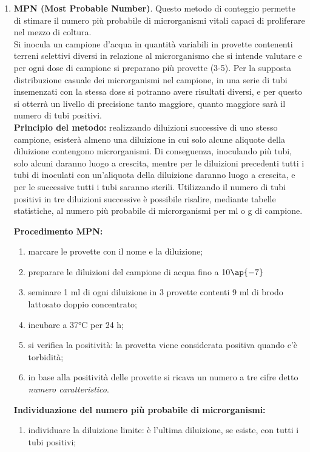 \documentclass[11pt]{book}
\begin{document}
\begin{itemize}
\begin{enumerate}
\item \textbf{MPN (Most Probable Number)}. Questo metodo di conteggio permette di stimare il numero più probabile di microrganismi vitali capaci di proliferare nel mezzo di coltura.\\
Si inocula un campione d’acqua in quantità variabili in provette contenenti terreni selettivi diversi in relazione al microrganismo che si intende valutare e per ogni dose di campione si preparano più provette (3-5).
Per la supposta distribuzione casuale dei microrganismi nel campione, in una serie di tubi insemenzati con la stessa dose si potranno avere risultati diversi, e per questo si otterrà un livello di precisione tanto maggiore, quanto maggiore sarà il numero di tubi positivi.\\
\textbf{Principio del metodo:} realizzando diluizioni successive di uno stesso campione, esisterà almeno una diluizione in cui solo alcune aliquote della diluizione contengono microrganismi. Di conseguenza, inoculando più tubi, solo alcuni daranno luogo a crescita, mentre per le diluizioni precedenti tutti i tubi di inoculati con un’aliquota della diluizione daranno luogo a crescita, e per le successive tutti i tubi saranno sterili. Utilizzando il numero di tubi positivi in tre diluizioni successive è possibile risalire, mediante tabelle statistiche, al numero più probabile di microrganismi per ml o g di campione.

\textbf{Procedimento MPN:}
\begin{enumerate}
\item marcare le provette con il nome e la diluizione;
\item preparare le diluizioni del campione di acqua fino a 10$\ap{-7}$
\item seminare 1 ml di ogni diluizione in 3 provette contenti 9 ml di brodo lattosato doppio concentrato;
\item incubare a 37°C per 24 h;
\item si verifica la positività: la provetta viene considerata positiva quando c’è torbidità;
\item in base alla positività delle provette si ricava un numero a tre cifre detto \emph{numero caratteristico}.\\
\end{enumerate}

\textbf{Individuazione del numero più probabile di microrganismi:}
\begin{enumerate}
\item individuare la diluizione limite: è l’ultima diluizione, se esiste, con tutti i tubi positivi;


\end{enumerate}
\end{enumerate}
\end{itemize}
\end{document}
